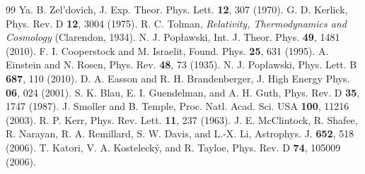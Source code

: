 \documentclass[prd,onecolumn,nofootinbib,showkeys]{revtex4}
\begin{document}
\begin{thebibliography}{99}
 Ya. B. Zel'dovich, J. Exp. Theor. Phys. Lett. {\bf 12}, 307 (1970).
 G. D. Kerlick, Phys. Rev. D {\bf 12}, 3004 (1975).
 R. C. Tolman, {\it Relativity, Thermodynamics and Cosmology} (Clarendon, 1934).
 N. J. Pop{\l}awski, Int. J. Theor. Phys. {\bf 49}, 1481 (2010).
 F. I. Cooperstock and M. Israelit, Found. Phys. {\bf 25}, 631 (1995).
 A. Einstein and N. Rosen, Phys. Rev. {\bf 48}, 73 (1935).
 N. J. Pop{\l}awski, Phys. Lett. B {\bf 687}, 110 (2010).
 D. A. Easson and R. H. Brandenberger, J. High Energy Phys. {\bf 06}, 024 (2001).
 S. K. Blau, E. I. Guendelman, and A. H. Guth, Phys. Rev. D {\bf 35}, 1747 (1987).
 J. Smoller and B. Temple, Proc. Natl. Acad. Sci. USA {\bf 100}, 11216 (2003).
 R. P. Kerr, Phys. Rev. Lett. {\bf 11}, 237 (1963).
 J. E. McClintock, R. Shafee, R. Narayan, R. A. Remillard, S. W. Davis, and L.-X. Li, Astrophys. J. {\bf 652}, 518 (2006).
 T. Katori, V. A. Kosteleck\'{y}, and R. Tayloe, Phys. Rev. D {\bf 74}, 105009 (2006).
\end{thebibliography}
\end{document}

